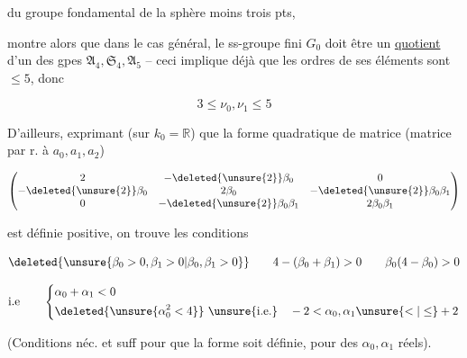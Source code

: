

 du groupe fondamental de la sphère moins trois pts, 

 montre alors que dans le cas général, le ss-groupe fini $G_0$  doit être un \uline{quotient} d'un des gpes $\mathfrak A_4,\mathfrak S_4,\mathfrak A_5$ -- ceci implique déjà que les ordres de ses éléments sont $\leq5$, donc

\[
 \boxed{3\leq\nu_0,\nu_1\leq5}
\]

D'ailleurs, exprimant (sur $k_0=\mathbb R$) que la forme quadratique de matrice (matrice par r. à $a_0,a_1,a_2$)

\[
 \begin{pmatrix}
 2 & -\deleted{\unsure{2}}\beta_0 & 0\\
 -\deleted{\unsure{2}}\beta_0 & 2\beta_0 & -\deleted{\unsure{2}}\beta_0\beta_1\\
 0 & -\deleted{\unsure{2}}\beta_0\beta_1 & 2\beta_0\beta_1
 \end{pmatrix}
\]

est définie positive, on trouve les conditions

\[
 \deleted{\unsure{\beta_0>0,\beta_1>0|\beta_0,\beta_1>0}}\qquad
 4-(\beta_0+\beta_1)>0\qquad\beta_0(4-\beta_0)>0
\]

\[
 \text{i.e}\qquad\left\{\begin{aligned}
 &\alpha_0+\alpha_1<0\\
 &\deleted{\unsure{\alpha_0^2<4}}\ \text{\unsure{i.e.}}\quad -2<\alpha_0,\alpha_1\unsure{<|\leq}+2
 \end{aligned}\right.
\]

(Conditions néc. et suff pour que la forme  soit définie, pour des  $\alpha_0,\alpha_1$ réels).
